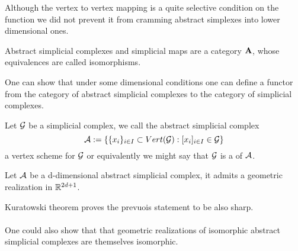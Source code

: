 \documentclass[../1.tex]{subfiles}
\begin{document}
    Although the vertex to vertex mapping is a quite selective condition on the function we did not prevent it from cramming
    abstract simplexes into lower dimensional ones.

    \begin{thm}
        Abstract simplicial complexes and simplicial maps are a category $\textbf{A}$, whose equivalences are called isomorphisms.
    \end{thm}

    One can show that under some dimensional conditions one can define a functor from the category of abstract simplicial complexes
    to the category of simplicial complexes.

    \begin{defn}
        Let $\mathcal{G}$ be a simplicial complex,  we call the abstract simplicial complex 
        \[ \mathcal{A} := \{ \{x_i\}_{i \in I} \subset Vert(\mathcal{G}) : [x_i]_{i \in I} \in \mathcal{G} \} \]
        a vertex scheme for $\mathcal{G}$ or equivalently we might say that $\mathcal{G}$ is a  of $\mathcal{A}$.
    \end{defn}

    \begin{thm}
        Let $\mathcal{A}$ be a d-dimensional abstract simplicial complex, it admits a geometric realization in $\mathbb{R}^{2d+1}$.
    \end{thm}
    Kuratowski theorem proves the prevuois statement to be also sharp.\\
    \hfill \\
    One could also show that that geometric realizations of isomorphic abstract simplicial complexes are themselves isomorphic.
\end{document}
